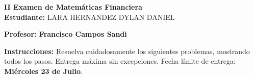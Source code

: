 \documentclass[10pt]{article}
\begin{document}
\newpage
\begin{center}
    {\LARGE \textbf{II Examen de Matemáticas Financiera}}\\[1em]
    {\large \textbf{Estudiante:} LARA HERNANDEZ DYLAN DANIEL}
\end{center}

\vspace{1cm}

\textbf{Profesor: Francisco Campos Sandi}

\vspace{0.5cm}

\textbf{Instrucciones:} Resuelva cuidadosamente los siguientes problemas, mostrando todos los pasos. Entrega máxima sin excepciones. Fecha límite de entrega: \textbf{Miércoles 23 de Julio}.

\vspace{1cm}
\end{document}

